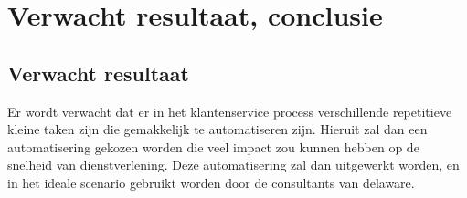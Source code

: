 





\section{Verwacht resultaat, conclusie}%
\label{sec:verwachte_resultaten}
\subsection{Verwacht resultaat}
\label{Verwacht resultaat}
Er wordt verwacht dat er in het klantenservice process verschillende repetitieve kleine taken zijn die gemakkelijk te automatiseren zijn. Hieruit zal dan een automatisering gekozen worden die veel impact zou kunnen hebben op de snelheid van dienstverlening. Deze automatisering zal dan uitgewerkt worden, en in het ideale scenario gebruikt worden door de consultants van delaware.
